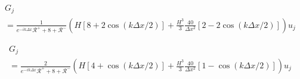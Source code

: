 \documentclass[12pt]{article}
\begin{document}
\begin{multline}
 G_{j} \\= \frac{1}{
 	e^{-ik\Delta x}\mathcal{R}^+ + 8 + \mathcal{R}^-}\left( H \left[8 + 2 \cos\left(k\Delta x/2\right) \right] + \frac{H^3}{3} \frac{40}{\Delta x^2}\left[ 2 - 2 \cos\left(k\Delta x/2\right) \right] \right) u_j
\end{multline}

\begin{multline}
G_{j} \\= \frac{2}{
	e^{-ik\Delta x}\mathcal{R}^+ + 8 + \mathcal{R}^-}\left( H \left[4 +  \cos\left(k\Delta x/2\right) \right] + \frac{H^3}{3} \frac{40}{\Delta x^2}\left[1 -  \cos\left(k\Delta x/2\right) \right] \right) u_j
\end{multline}
\end{document}
